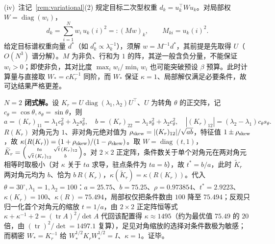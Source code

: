 \documentclass[fontset=windows,11pt]{ctexart}
\newcommand{\W}{W}
\DeclareMathOperator{\diag}{diag}
\DeclareMathOperator{\tr}{tr}
\numberwithin{equation}{section}
\begin{document}
\par\noindent(iv)~注记~\ref{rem:variational}(2) 规定目标二次型权重 $d_k=u_k^\top\W u_k$。对局部权 $\W=\diag(w_i)$，
\[
d_k=\sum_{i=1}^N w_i\,u_k(i)^2=:(Mw)_k,\qquad M_{ki}=u_k(i)^2.
\]
给定目标谱权重向量 $d^*$（如 $d^*_k\propto\lambda_k^{-1}$），须解 $w=M^{-1}d^*$，其前提是先取得 $U$（$O(N^3)$ 谱分解）。$M$ 为非负、行和为 $1$ 的阵，其逆一般含负分量，不能保证 $w_i>0$；即使非负，其对比度 $\max_iw_i/\min_iw_i$ 也可能突破预设 $\beta$ 预算。此时计算量与直接取 $\W_*=cK_r^{-1}$ 同阶，而 $\W_*$ 保证 $\kappa=1$、局部解仅满足必要条件，故可达结果严格更差。
\par\noindent\textbf{$N=2$ 闭式解。}设 $K_r=U\diag(\lambda_1,\lambda_2)U^\top$、$U$ 为转角 $\theta$ 的正交阵，记 $c_\theta=\cos\theta,s_\theta=\sin\theta$，则
\[
a=(K_r)_{11}=\lambda_1c_\theta^2+\lambda_2s_\theta^2,\quad
b=(K_r)_{22}=\lambda_1s_\theta^2+\lambda_2c_\theta^2,\quad
|(K_r)_{12}|=(\lambda_2-\lambda_1)c_\theta s_\theta.
\]
$R(K_r)$ 对角元为 $1$、非对角元绝对值为 $\rho_{\rm skew}=|(K_r)_{12}|/\sqrt{ab}$，特征值 $1\pm\rho_{\rm skew}$，故 $\kappa(R(K_r))=(1+\rho_{\rm skew})/(1-\rho_{\rm skew})$。取 $\W=\diag(t,1)$，$\widetilde K_r=\begin{psmallmatrix}ta&\sqrt t\,(K_r)_{12}\\ \sqrt t\,(K_r)_{12}&b\end{psmallmatrix}$。对 $2\times2$ 正定阵，条件数关于单个对角元在两对角元相等时取极小（对 $\kappa$ 关于 $ta$ 求导，驻点条件为 $ta=b$），故 $t^*=b/a$，此时 $\widetilde K_r$ 两对角元均为 $b$、恰为 $b\,R(K_r)$，$\kappa(\widetilde K_r)=\kappa(R(K_r))$。代入 $\theta=30^\circ,\lambda_1=1,\lambda_2=100$：$a=25.75$、$b=75.25$、$\rho=0.973854$、$t^*=2.9223$、$\kappa(K_r)=100$、$\kappa(R)=75.494$，局部权仅把条件数由 $100$ 降至 $75.494$；反观只归一化首个对角元的缩放 $t=1/a$，由 $2\times2$ 正定阵恒等式 $\kappa+\kappa^{-1}+2=(\tr A)^2/\det A$ 代回该配置得 $\kappa\approx1495$（约为最优值 $75.49$ 的 $20$ 倍，由 $(\tr)^2/\det=1497.1$ 复算），足见对角缩放的选择对条件数极为敏感；而稠密 $\W_*=K_r^{-1}$ 给 $\W_*^{1/2}K_r\W_*^{1/2}=I$、$\kappa=1$。证毕。
\end{document}
